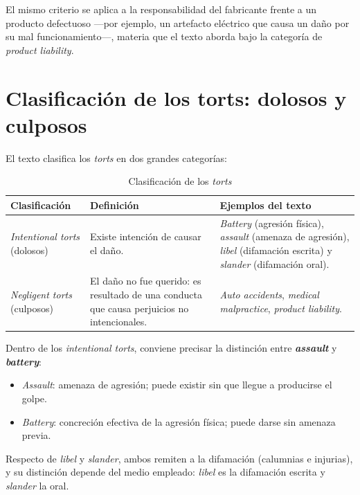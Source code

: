 \documentclass[12pt,oneside]{book}
\begin{document}
El mismo criterio se aplica a la responsabilidad del fabricante frente a un producto defectuoso ---por ejemplo, un artefacto eléctrico que causa un daño por su mal funcionamiento---, materia que el texto aborda bajo la categoría de \textit{product liability}.

\section{Clasificación de los torts: dolosos y culposos}

El texto clasifica los \textit{torts} en dos grandes categorías:

\begin{table}[H]
\centering
\caption{Clasificación de los \textit{torts}}
\begin{tabularx}{\textwidth}{
    >{\raggedright\arraybackslash}p{}
    >{\raggedright\arraybackslash}X
    >{\raggedright\arraybackslash}p{}
}
\toprule
\textbf{Clasificación} & \textbf{Definición} & \textbf{Ejemplos del texto} \\
\midrule
\textit{Intentional torts} (dolosos) & Existe intención de causar el daño. & \textit{Battery} (agresión física), \textit{assault} (amenaza de agresión), \textit{libel} (difamación escrita) y \textit{slander} (difamación oral). \\
\addlinespace
\textit{Negligent torts} (culposos) & El daño no fue querido: es resultado de una conducta que causa perjuicios no intencionales. & \textit{Auto accidents}, \textit{medical malpractice}, \textit{product liability}. \\
\bottomrule
\end{tabularx}
\end{table}

Dentro de los \textit{intentional torts}, conviene precisar la distinción entre \textbf{\textit{assault}} y \textbf{\textit{battery}}:
\begin{itemize}
    \item \textit{Assault}: amenaza de agresión; puede existir sin que llegue a producirse el golpe.
    \item \textit{Battery}: concreción efectiva de la agresión física; puede darse sin amenaza previa.
\end{itemize}

Respecto de \textit{libel} y \textit{slander}, ambos remiten a la difamación (calumnias e injurias), y su distinción depende del medio empleado: \textit{libel} es la difamación escrita y \textit{slander} la oral.
\end{document}
